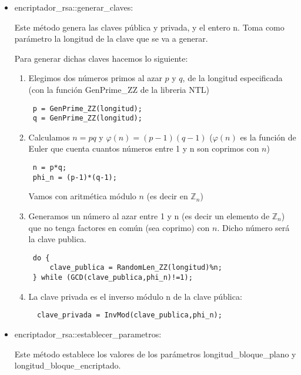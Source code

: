 \documentclass[spanish]{article}
\begin{document}
\begin{itemize}

\item encriptador\_rsa::generar\_claves:

Este método genera las claves pública y privada, y el entero n. 
Toma como parámetro la longitud de la clave que se va a generar.

Para generar dichas claves hacemos lo siguiente:

\begin{enumerate} 

\item Elegimos dos números primos al azar $p$ y $q$, de la longitud especificada 
(con la función GenPrime\_ZZ de la libreria NTL)

\begin{verbatim}
 p = GenPrime_ZZ(longitud);
 q = GenPrime_ZZ(longitud);
\end{verbatim}

\item Calculamos $n=pq$ y $\varphi(n)=(p-1)(q-1)$ ($\varphi(n)$ es la función
de Euler que cuenta cuantos números entre 1 y n son coprimos con $n$)

\begin{verbatim}
 n = p*q;
 phi_n = (p-1)*(q-1);
\end{verbatim} 

Vamos con aritmética módulo $n$ (es decir en $\mathbb{Z}_n$)

\item Generamos un número al azar entre 1 y n (es decir un elemento de
$\mathbb{Z}_n$) que no tenga factores en común (sea coprimo) con $n$. 
Dicho número será la clave publica.

\begin{verbatim}
 do {
	 clave_publica = RandomLen_ZZ(longitud)%n;
 } while (GCD(clave_publica,phi_n)!=1);
\end{verbatim}

\item La clave privada es el inverso módulo n de la clave pública:

\begin{verbatim}
  clave_privada = InvMod(clave_publica,phi_n);  
\end{verbatim}

\end{enumerate}

\item encriptador\_rsa::establecer\_parametros:

Este método establece los valores de los parámetros longitud\_bloque\_plano 
y longitud\_bloque\_encriptado. 


\end{itemize}
\end{document}

